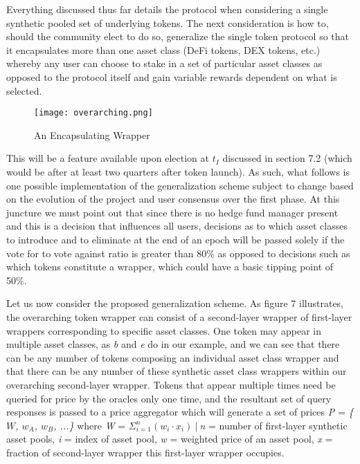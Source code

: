 \documentclass[12pt]{article}
\begin{document}
    Everything discussed thus far details the protocol when considering a single synthetic pooled set of underlying tokens. The next consideration is how to, should the community elect to do so, generalize the single token protocol so that it encapsulates more than one asset class (DeFi tokens, DEX tokens, etc.) whereby any user can choose to stake in a set of particular asset classes as opposed to the protocol itself and gain variable rewards dependent on what is selected. \par
    
    \vspace{0.3cm}
    
    \begin{figure}[!htb] 
        \centering
        \texttt{[image: overarching.png]}
        \caption{An Encapsulating Wrapper}
        \label{fig:my_label}
    \end{figure}
    
    This will be a feature available upon election at \emph{$t_{I}$} discussed in section 7.2 (which would be after at least two quarters after token launch). As such, what follows is one possible implementation of the generalization scheme subject to change based on the evolution of the project and user consensus over the first phase. At this juncture we must point out that since there is no hedge fund manager present and this is a decision that influences all users, decisions as to which asset classes to introduce and to eliminate at the end of an epoch will be passed solely if the vote for to vote against ratio is greater than 80\% as opposed to decisions such as which tokens constitute a wrapper, which could have a basic tipping point of 50\%. \par
    
    \vspace{0.15cm}
    
    Let us now consider the proposed generalization scheme. As figure 7 illustrates, the overarching token wrapper can consist of a second-layer wrapper of first-layer wrappers corresponding to specific asset classes. One token may appear in multiple asset classes, as \emph{b} and \emph{e} do in our example, and we can see that there can be any number of tokens composing an individual asset class wrapper and that there can be any number of these synthetic asset class wrappers within our overarching second-layer  wrapper. Tokens that appear multiple times need be queried for price by the oracles only one time, and the resultant set of query responses is passed to a price aggregator which will generate a set of prices \emph{P} = \emph{\{$W$, $w_A$, $w_B$, ...\}} where \linebreak \emph{W} = $\Sigma^n_{i=1}(w_i \cdot x_i)~|~$\emph{n} = number of first-layer synthetic asset pools, \emph{i} = index of asset pool, \emph{w} = weighted price of an asset pool, \emph{x} = fraction of second-layer wrapper this first-layer wrapper occupies.\par
    
\end{document}
